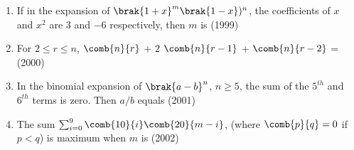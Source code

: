 \begin{enumerate}[label=\thesubsection.\arabic*,ref=\thesubsection.\theenumi]
\begin{enumerate}
\end{enumerate}
\item If in the expansion of $\brak{1+x}^m\brak{1-x})^n$, the coefficients of $x$ and $x^2$ are $3$ and $-6$ respectively, then $m$ is
\hfill(1999)
\begin{enumerate}
\end{enumerate}
\item For $2\leq r\leq n$, $\comb{n}{r}$ + $2$ $\comb{n}{r-1}$ + $\comb{n}{r-2}$ =\hfill(2000)
\begin{enumerate}
\end{enumerate}
\item In the binomial expansion of $\brak{a-b}^n$, $n\geq 5$, the sum of  the $5^{th}$ and $6^{th}$ terms is zero. Then $a/b$  equals
\hfill(2001)
\begin{enumerate}
\end{enumerate}
\item The sum $\sum_{i=0}^{9} \comb{10}{i}\comb{20}{m-i}$, 
 (where $\comb{p}{q}=0$ if {
$p<q$)} is maximum when $m$ is \hfil(2002)
\begin{enumerate}

\end{enumerate}
\end{enumerate}
